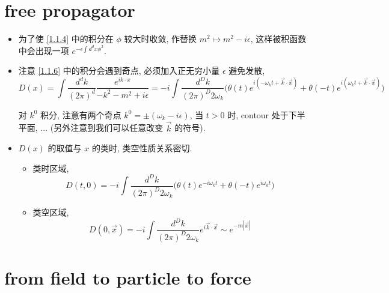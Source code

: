 \section{free propagator}
\begin{itemize}
	\item 为了使 \eqref{1.1.4} 中的积分在 $\phi$ 较大时收敛, 作替换 $m^2 \mapsto m^2 - i \epsilon$, 这样被积函数中会出现一项 $e^{- \epsilon \int d^d x \phi^2}$.
	
	\item 注意 \eqref{1.1.6} 中的积分会遇到奇点, 必须加入正无穷小量 $\epsilon$ 避免发散,
	\begin{equation} \label{1.2.1}
		D(x) = \int \frac{d^d k}{(2 \pi)^d} \frac{e^{i k \cdot x}}{- k^2 - m^2 + i \epsilon} = - i \int \frac{d^D k}{(2 \pi)^D 2 \omega_k} \Big( \theta(t) e^{i (- \omega_k t + \vec{k} \cdot \vec{x})} + \theta(- t) e^{i (\omega_k t + \vec{k} \cdot \vec{x})} \Big)
	\end{equation}
	
	\begin{tcolorbox}[title=calculation:]
		对 $k^0$ 积分, 注意有两个奇点 $k^0 = \pm (\omega_k - i \epsilon)$, 当 $t > 0$ 时, contour 处于下半平面, ... (另外注意到我们可以任意改变 $\vec{k}$ 的符号).
	\end{tcolorbox}
	
	\item $D(x)$ 的取值与 $x$ 的类时, 类空性质关系密切.
	\begin{itemize}
		\item 类时区域,
		\begin{equation}
			D(t, 0) = - i \int \frac{d^D k}{(2 \pi)^D 2 \omega_k} \Big( \theta(t) e^{- i \omega_k t} + \theta(- t) e^{i \omega_k t} \Big)
		\end{equation}
		
		\item 类空区域,
		\begin{equation}
			D(0, \vec{x}) = - i \int \frac{d^D k}{(2 \pi)^D 2 \omega_k} e^{i \vec{k} \cdot \vec{x}} \sim e^{- m |\vec{x}|}
		\end{equation}
	\end{itemize}
\end{itemize}

\section{from field to particle to force}
